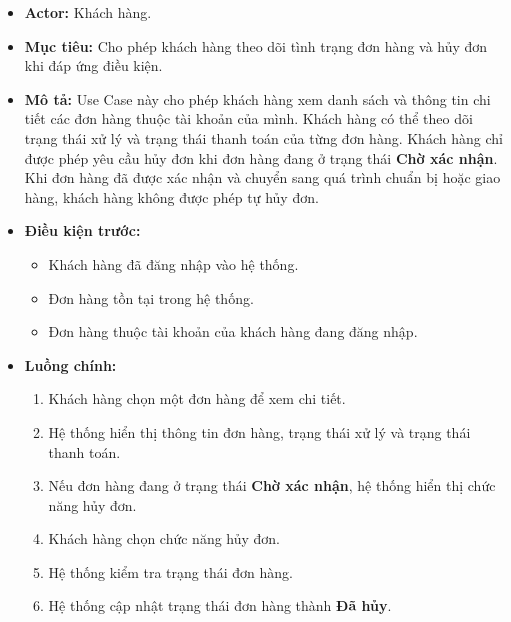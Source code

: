 \documentclass[12pt,a4paper]{article}
\begin{document}
\begin{itemize}

 \item \textbf{Actor:} Khách hàng.

 \item \textbf{Mục tiêu:} Cho phép khách hàng theo dõi tình trạng đơn hàng và hủy đơn khi đáp ứng điều kiện.

 \item \textbf{Mô tả:} Use Case này cho phép khách hàng xem danh sách và thông tin chi tiết các đơn hàng thuộc tài khoản của mình. Khách hàng có thể theo dõi trạng thái xử lý và trạng thái thanh toán của từng đơn hàng. Khách hàng chỉ được phép yêu cầu hủy đơn khi đơn hàng đang ở trạng thái \textbf{Chờ xác nhận}. Khi đơn hàng đã được xác nhận và chuyển sang quá trình chuẩn bị hoặc giao hàng, khách hàng không được phép tự hủy đơn.

 \item \textbf{Điều kiện trước:}

 \begin{itemize}

  \item Khách hàng đã đăng nhập vào hệ thống.

  \item Đơn hàng tồn tại trong hệ thống.

  \item Đơn hàng thuộc tài khoản của khách hàng đang đăng nhập.

 \end{itemize}

 \item \textbf{Luồng chính:}

 \begin{enumerate}

  \item Khách hàng chọn một đơn hàng để xem chi tiết.

  \item Hệ thống hiển thị thông tin đơn hàng, trạng thái xử lý và trạng thái thanh toán.

  \item Nếu đơn hàng đang ở trạng thái \textbf{Chờ xác nhận}, hệ thống hiển thị chức năng hủy đơn.

  \item Khách hàng chọn chức năng hủy đơn.

  \item Hệ thống kiểm tra trạng thái đơn hàng.

  \item Hệ thống cập nhật trạng thái đơn hàng thành \textbf{Đã hủy}.


\end{enumerate}
\end{itemize}
\end{document}
